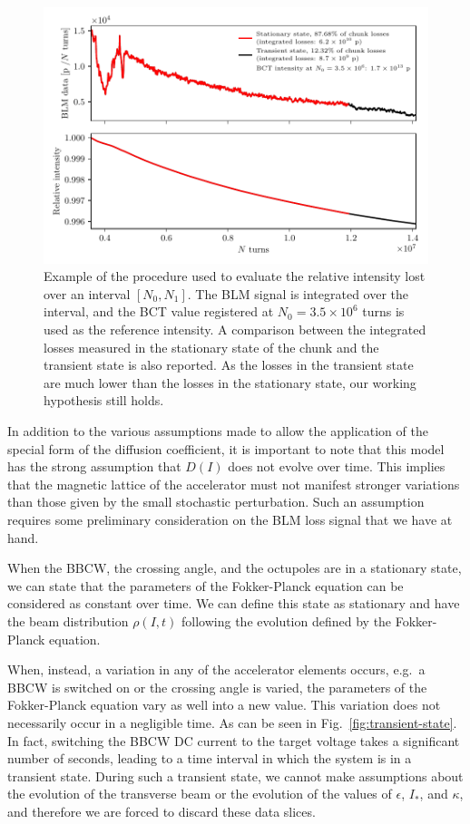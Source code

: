 \begin{figure}[hpt]
    \centering
    \includegraphics[width=1.0\textwidth]{5_wire_compensators_LHC/figs/stationary_transient_example_chunk.pdf}
    \caption{Example of the procedure used to evaluate the relative intensity lost over an interval $[N_0, N_1]$. The BLM signal is integrated over the interval, and the BCT value registered at $N_0=3.5\times10^6$ turns is used as the reference intensity. A comparison between the integrated losses measured in the stationary state of the chunk and the transient state is also reported. As the losses in the transient state are much lower than the losses in the stationary state, our working hypothesis still holds.}
    \label{fig:blm-to-intensity}
\end{figure}

In addition to the various assumptions made to allow the application of the special form of the diffusion coefficient, it is important to note that this model has the strong assumption that $D(I)$ does not evolve over time. This implies that the magnetic lattice of the accelerator must not manifest stronger variations than those given by the small stochastic perturbation. Such an assumption requires some preliminary consideration on the BLM loss signal that we have at hand.

When the BBCW, the crossing angle, and the octupoles are in a stationary state, we can state that the parameters of the Fokker-Planck equation can be considered as constant over time. We can define this state as stationary and have the beam distribution $\rho(I, t)$ following the evolution defined by the Fokker-Planck equation.

When, instead, a variation in any of the accelerator elements occurs, e.g.\ a BBCW is switched on or the crossing angle is varied, the parameters of the Fokker-Planck equation vary as well into a new value. This variation does not necessarily occur in a negligible time. As can be seen in Fig.~\ref{fig:transient-state}. In fact, switching the BBCW DC current to the target voltage takes a significant number of seconds, leading to a time interval in which the system is in a transient state. During such a transient state, we cannot make assumptions about the evolution of the transverse beam or the evolution of the values of $\epsilon$, $I_\ast$, and $\kappa$, and therefore we are forced to discard these data slices.

